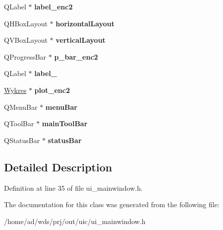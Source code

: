 \begin{DoxyCompactItemize}
\item 
Q\+Label $\ast$ {\bfseries label\+\_\+enc2}\hypertarget{class_ui___main_window_a45386cfb7a447387726f39d3b88ac284}{}\label{class_ui___main_window_a45386cfb7a447387726f39d3b88ac284}

\item 
Q\+H\+Box\+Layout $\ast$ {\bfseries horizontal\+Layout}\hypertarget{class_ui___main_window_acd6fdc9ebacc4b25b834162380d75ce8}{}\label{class_ui___main_window_acd6fdc9ebacc4b25b834162380d75ce8}

\item 
Q\+V\+Box\+Layout $\ast$ {\bfseries vertical\+Layout}\hypertarget{class_ui___main_window_aecd96a04789fcfec3f98d80390ad8184}{}\label{class_ui___main_window_aecd96a04789fcfec3f98d80390ad8184}

\item 
Q\+Progress\+Bar $\ast$ {\bfseries p\+\_\+bar\+\_\+enc2}\hypertarget{class_ui___main_window_ab7091caad45ece6b2a5b66bc3d06094d}{}\label{class_ui___main_window_ab7091caad45ece6b2a5b66bc3d06094d}

\item 
Q\+Label $\ast$ {\bfseries label\+\_}\hypertarget{class_ui___main_window_a2e2516d755e4dd53fc905dabddf2738a}{}\label{class_ui___main_window_a2e2516d755e4dd53fc905dabddf2738a}

\item 
\hyperlink{class_wykres}{Wykres} $\ast$ {\bfseries plot\+\_\+enc2}\hypertarget{class_ui___main_window_aaa68aa6847efa132f579aedd82b3fadf}{}\label{class_ui___main_window_aaa68aa6847efa132f579aedd82b3fadf}

\item 
Q\+Menu\+Bar $\ast$ {\bfseries menu\+Bar}\hypertarget{class_ui___main_window_a2be1c24ec9adfca18e1dcc951931457f}{}\label{class_ui___main_window_a2be1c24ec9adfca18e1dcc951931457f}

\item 
Q\+Tool\+Bar $\ast$ {\bfseries main\+Tool\+Bar}\hypertarget{class_ui___main_window_a5172877001c8c7b4e0f6de50421867d1}{}\label{class_ui___main_window_a5172877001c8c7b4e0f6de50421867d1}

\item 
Q\+Status\+Bar $\ast$ {\bfseries status\+Bar}\hypertarget{class_ui___main_window_a50fa481337604bcc8bf68de18ab16ecd}{}\label{class_ui___main_window_a50fa481337604bcc8bf68de18ab16ecd}

\end{DoxyCompactItemize}


\subsection{Detailed Description}


Definition at line 35 of file ui\+\_\+mainwindow.\+h.



The documentation for this class was generated from the following file\+:\begin{DoxyCompactItemize}
\item 
/home/ad/wds/prj/out/uic/ui\+\_\+mainwindow.\+h\end{DoxyCompactItemize}
